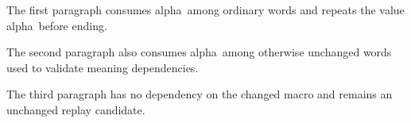 
\hsize=220pt \vsize=240pt
\def\variant{alpha}
The first paragraph consumes \variant\ among ordinary words and repeats the value \variant\ before ending.

The second paragraph also consumes \variant\ among otherwise unchanged words used to validate meaning dependencies.

The third paragraph has no dependency on the changed macro and remains an unchanged replay candidate.
\bye
